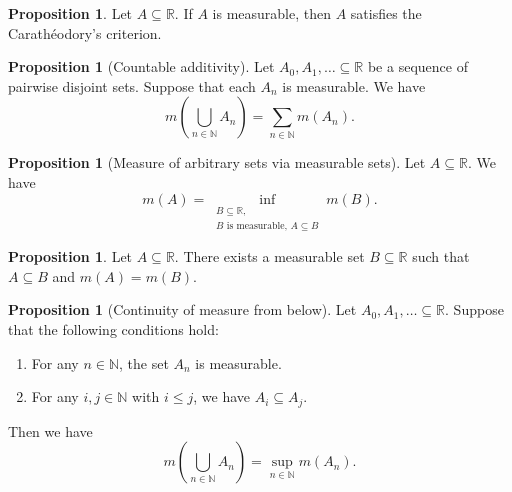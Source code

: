 \documentclass{article}
\theoremstyle{definition}
\newtheorem{proposition}[theorem]{Proposition}
\begin{document}
\begin{proposition}
  Let $A \subseteq \mathbb{R}$.
  If $A$ is measurable,
  then $A$ satisfies the Carath\'eodory's criterion.
\end{proposition}


\begin{proposition}[Countable additivity]
  Let $A_0, A_1, \dots \subseteq \mathbb{R}$ be a sequence of pairwise disjoint sets.
  Suppose that each $A_n$ is measurable.
  We have 
  \begin{equation*}
    m\left( \bigcup_{n \in \mathbb{N}} A_n \right) 
      = \sum_{n \in \mathbb{N}} m(A_n).
  \end{equation*}
\end{proposition}

\begin{proposition}[Measure of arbitrary sets via measurable sets]
  Let $A \subseteq \mathbb{R}$.
  We have 
  \begin{equation*}
    m(A) = \inf_{\substack{B \subseteq \mathbb{R},\\ \text{$B$ is measurable},\, A \subseteq B}} m(B).
  \end{equation*}
\end{proposition}

\begin{proposition}
  Let $A \subseteq \mathbb{R}$.
  There exists a measurable set $B \subseteq \mathbb{R}$
  such that $A \subseteq B$ and $m(A) = m(B)$.
\end{proposition}

\begin{proposition}[Continuity of measure from below]
  Let $A_0, A_1, \dots \subseteq \mathbb{R}$. 
  Suppose that the following conditions hold:
  \begin{enumerate}
    \item For any $n \in \mathbb{N}$, the set $A_n$ is measurable.
    \item For any $i, j \in \mathbb{N}$ with $i \leq j$, we have $A_i \subseteq A_j$.
  \end{enumerate}
  Then we have
  \begin{equation*}
    m\left( \bigcup_{n \in \mathbb{N}} A_n \right) = \sup_{n \in \mathbb{N}} m(A_n).
  \end{equation*}
\end{proposition}
\end{document}
